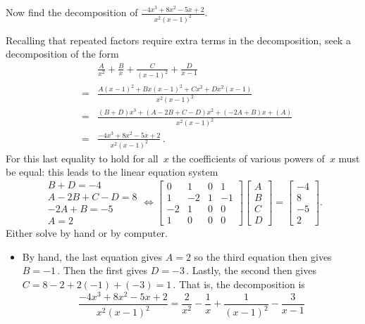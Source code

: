 \begin{reduce}
\begin{example}
Now find the  decomposition of \(\frac{-4x^3+8x^2-5x+2}{x^2(x-1)^2}\).
\begin{solution} 
Recalling that repeated factors require extra terms in the decomposition, seek a decomposition of the form
\begin{eqnarray*}&&
\frac A{x^2}+\frac B{x}+ \frac C{(x-1)^2} +\frac D{x-1}
\\&=&\frac{A(x-1)^2+Bx(x-1)^2 +Cx^2+ Dx^2(x-1)} {x^2(x-1)^2}
\\&=&\frac{(B+D)x^3+(A-2B+C-D)x^2+(-2A+B)x+(A)} {x^2(x-1)^2}
\\&=&\frac{-4x^3+8x^2-5x+2}{x^2(x-1)^2}\,.
\end{eqnarray*}
For this last equality to hold for all~\(x\) the coefficients of various powers of~\(x\) must be equal: this leads to the linear equation system
\begin{equation*}
\begin{array}{l}
B+D=-4 \\
A-2B+C-D=8 \\
-2A+B=-5\\
A=2
\end{array}
\iff
\begin{bmatrix} 0&1&0&1
\\1&-2&1&-1
\\-2&1&0&0
\\1&0&0&0 \end{bmatrix}\begin{bmatrix} A\\B\\C\\D \end{bmatrix}
=\begin{bmatrix} -4\\8\\-5\\2 \end{bmatrix}.
\end{equation*}
Either solve by hand or by computer.
\begin{itemize}
\item By hand, the last equation gives \(A=2\) so the third equation then gives \(B=-1\)\,.  
Then the first gives \(D=-3\)\,.  
Lastly, the second then gives \(C=8-2+2(-1)+(-3)=1\)\,.  
That is, the decomposition is
\begin{equation*}
\frac{-4x^3+8x^2-5x+2}{x^2(x-1)^2}
=\frac 2{x^2}-\frac 1{x}+ \frac 1{(x-1)^2} -\frac 3{x-1}
\end{equation*}


\end{itemize}
\end{solution}
\end{example}
\end{reduce}

